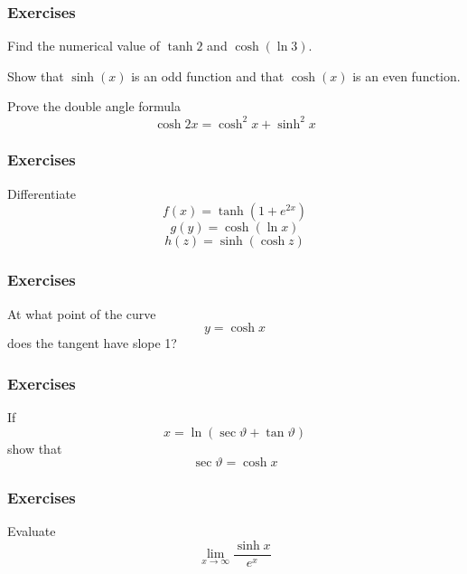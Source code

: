 \documentclass[xcolor=dvipsnames]{beamer}
\begin{document}
\begin{frame}
  \frametitle{Exercises}
{\ubung} Find the numerical value of $\tanh{}2$ and $\cosh(\ln{}3)$.

\medskip

{\ubung} Show that $\sinh(x)$ is an odd function and that $\cosh(x)$
is an even function.

\medskip

{\ubung} Prove the double angle formula
\begin{equation}
  \label{eq:chieshah}
  \cosh{}2x=\cosh^{2}x+\sinh^{2}x
\end{equation}
\end{frame}

\begin{frame}
  \frametitle{Exercises}
{\ubung} Differentiate
\begin{equation}
  \label{eq:pasaanee}
  f(x)=\tanh(1+e^{2x})
\end{equation}
\begin{equation}
  \label{eq:gaitocee}
  g(y)=\cosh(\ln{}x)
\end{equation}
\begin{equation}
  \label{eq:sahwiesh}
  h(z)=\sinh(\cosh{}z)
\end{equation}
\end{frame}

\begin{frame}
  \frametitle{Exercises}
{\ubung} At what point of the curve
\begin{equation}
  \label{eq:geipaifo}
  y=\cosh{}x
\end{equation}
does the tangent have slope 1?
\end{frame}

\begin{frame}
  \frametitle{Exercises}
{\ubung} If
\begin{equation}
  \label{eq:ohgaquoh}
  x=\ln(\sec\vartheta+\tan\vartheta)
\end{equation}
show that
\begin{equation}
  \label{eq:sheighuw}
  \sec\vartheta=\cosh{}x
\end{equation}

\end{frame}

\begin{frame}
  \frametitle{Exercises}
{\ubung} Evaluate
\begin{equation}
  \label{eq:ielaicah}
  \lim_{x\rightarrow\infty}\frac{\sinh{}x}{e^{x}}
\end{equation}
\end{frame}
\end{document}
